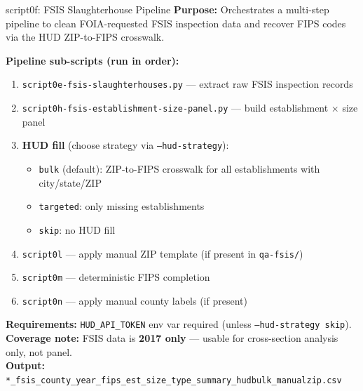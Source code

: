 \documentclass[aspectratio=169]{beamer}
\begin{document}
\begin{frame}{script0f: FSIS Slaughterhouse Pipeline}
\textbf{Purpose:} Orchestrates a multi-step pipeline to clean FOIA-requested FSIS inspection data and recover FIPS codes via the HUD ZIP-to-FIPS crosswalk.

\vspace{0.3em}
\textbf{Pipeline sub-scripts (run in order):}
\begin{enumerate}\small
    \item \texttt{script0e-fsis-slaughterhouses.py} — extract raw FSIS inspection records
    \item \texttt{script0h-fsis-establishment-size-panel.py} — build establishment × size panel
    \item \textbf{HUD fill} (choose strategy via \texttt{--hud-strategy}):
    \begin{itemize}
        \item \texttt{bulk} (default): ZIP-to-FIPS crosswalk for all establishments with city/state/ZIP
        \item \texttt{targeted}: only missing establishments
        \item \texttt{skip}: no HUD fill
    \end{itemize}
    \item \texttt{script0l} — apply manual ZIP template (if present in \texttt{qa-fsis/})
    \item \texttt{script0m} — deterministic FIPS completion
    \item \texttt{script0n} — apply manual county labels (if present)
\end{enumerate}

\vspace{0.3em}
\textbf{Requirements:} \texttt{HUD\_API\_TOKEN} env var required (unless \texttt{--hud-strategy skip}). \\
\textbf{Coverage note:} FSIS data is \textbf{2017 only} — usable for cross-section analysis only, not panel. \\
\textbf{Output:} \texttt{*\_fsis\_county\_year\_fips\_est\_size\_type\_summary\_hudbulk\_manualzip.csv}
\end{frame}

\end{document}
